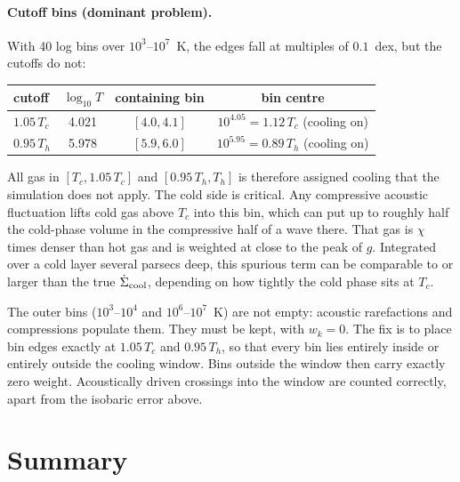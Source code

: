 \documentclass[11pt]{article}
\begin{document}
\paragraph{Cutoff bins (dominant problem).} With 40 log bins over $10^3$--$10^7$~K, the edges fall at multiples of $0.1$~dex, but the cutoffs do not:

\begin{center}
\begin{tabular}{lccc}
\toprule
cutoff & $\log_{10}T$ & containing bin & bin centre\\
\midrule
$1.05\,T_c$ & 4.021 & $[4.0,4.1]$ & $10^{4.05}=1.12\,T_c$ (cooling on)\\
$0.95\,T_h$ & 5.978 & $[5.9,6.0]$ & $10^{5.95}=0.89\,T_h$ (cooling on)\\
\bottomrule
\end{tabular}
\end{center}

All gas in $[T_c,1.05\,T_c]$ and $[0.95\,T_h,T_h]$ is therefore assigned cooling that the simulation does not apply. The cold side is critical. Any compressive acoustic fluctuation lifts cold gas above $T_c$ into this bin, which can put up to roughly half the cold-phase volume in the compressive half of a wave there. That gas is $\chi$ times denser than hot gas and is weighted at close to the peak of $g$. Integrated over a cold layer several parsecs deep, this spurious term can be comparable to or larger than the true $\dot\Sigma_{\rm cool}$, depending on how tightly the cold phase sits at $T_c$.

The outer bins ($10^3$--$10^4$ and $10^6$--$10^7$~K) are not empty: acoustic rarefactions and compressions populate them. They must be kept, with $w_k=0$. The fix is to place bin edges exactly at $1.05\,T_c$ and $0.95\,T_h$, so that every bin lies entirely inside or entirely outside the cooling window. Bins outside the window then carry exactly zero weight. Acoustically driven crossings into the window are counted correctly, apart from the isobaric error above.

\section{Summary}
\end{document}
